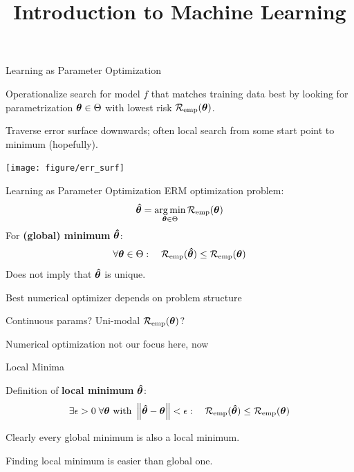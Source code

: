 \documentclass[11pt,compress,t,notes=noshow, xcolor=table]{beamer}
\title{Introduction to Machine Learning}
\begin{document}


\begin{framei}{Learning as Parameter Optimization}
\item Operationalize search for model $f$ that matches training data best by looking for parametrization $\bm{\theta} \in \Theta$ with lowest risk $\mathcal{R}_{\text{emp}}(\bm{\theta})$.
\item Traverse error surface downwards; often local search from some start point to minimum (hopefully).
\vfill
\begin{center}
\texttt{[image: figure/err\_surf]}
\end{center}
\end{framei}


\begin{frame2}{Learning as Parameter Optimization}
ERM optimization problem:
$$
\bm{\hat\theta} = \mathop{\mathrm{arg\,min}}_{\bm{\theta} \in \Theta} \mathcal{R}_{\text{emp}}(\bm{\theta}) 
$$
For \textbf{(global) minimum} $\bm{\hat\theta}$:
$$
\forall \bm{\theta} \in \Theta :\quad \mathcal{R}_{\text{emp}}(\bm{\hat\theta}) \leq \mathcal{R}_{\text{emp}}(\bm{\theta}) 
$$
Does not imply that $\bm{\hat\theta}$ is unique. \\
\vfill
\begin{itemizeM}
\item Best numerical optimizer depends on problem structure
\item Continuous params? Uni-modal $\mathcal{R}_{\text{emp}}(\bm{\theta})$? 
\item Numerical optimization not our focus here, now
\end{itemizeM}
\end{frame2}


\begin{framei}{Local Minima}
\item Definition of \textbf{local minimum} $\bm{\hat\theta}$:
$$
\exists \epsilon > 0\; \forall \bm{\theta} \text{ with } \left\Vert\bm{\hat\theta} - \bm{\theta}\right\Vert < \epsilon: \quad \mathcal{R}_{\text{emp}}(\bm{\hat\theta}) \leq \mathcal{R}_{\text{emp}}(\bm{\theta}) 
$$
\item Clearly every global minimum is also a local minimum.
\item Finding local minimum is easier than global one.
\vfill
{}
\end{framei}
\end{document}
